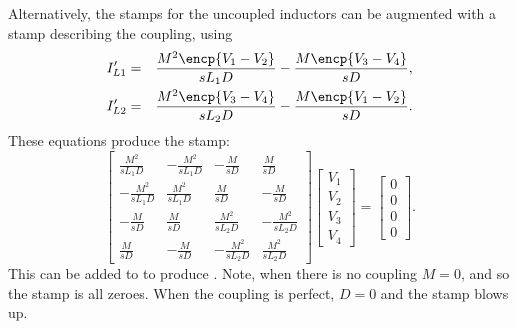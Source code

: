 \documentclass[a4paper, 12pt]{article}
\begin{document}
Alternatively, the stamps for the uncoupled inductors can be augmented
with a stamp describing the coupling, using
%
\begin{eqnarray}
  I'_{L1} & = & \frac{M^2\encp{V_1 - V_2}}{sL_1 D} - \frac{M\encp{V_3 - V_4}}{sD}, \\
  I'_{L2} & = & \frac{M^2\encp{V_3 - V_4}}{sL_2 D} - \frac{M\encp{V_1 - V_2}}{sD}.  
\end{eqnarray}
%
These equations produce the stamp:
%
\begin{equation}
  \begin{bmatrix}
    \frac{M^2}{sL_1 D} & -\frac{M^2}{sL_1 D} & -\frac{M}{sD}  & \frac{M}{sD} \\
   -\frac{M^2}{sL_1 D} & \frac{M^2}{sL_1 D}  & \frac{M}{sD}  & -\frac{M}{sD} \\
  -\frac{M}{sD} & \frac{M}{sD} &  \frac{M^2}{sL_2 D} & -\frac{M^2}{sL_2 D}   \\
   \frac{M}{sD} & -\frac{M}{sD} & -\frac{M^2}{sL_2 D} & \frac{M^2}{sL_2 D}  
  \end{bmatrix}
  \begin{bmatrix}
    V_1 \\ V_2 \\ V_3 \\ V_4
  \end{bmatrix}
=
\begin{bmatrix}
0 \\ 0 \\ 0 \\ 0
\end{bmatrix}.
\end{equation}
%
This can be added to  to produce
.  Note, when there is no coupling $M=0$, and so
the stamp is all zeroes.  When the coupling is perfect, $D=0$ and the
stamp blows up.
\end{document}
